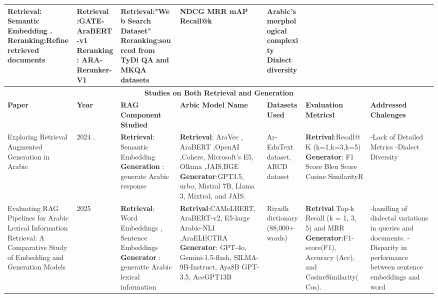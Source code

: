 \documentclass[runningheads]{llncs}
\begin{document}
\begin{table}
{\begin{tabular}{|p{3.5cm}|p{1.4cm}|p{3.5cm}|p{4.5cm}|p{3cm}|p{3.5cm}|p{3.5cm}|}
			\textbf{Retrieval}: Semantic Embedding . \newline 
			\textbf{Reranking}:Refine retrieved documents & Retrieval :GATE-AraBERT-v1 \newline
			Reranking : ARA-Reranker-V1\newline
			 &Retrieval:"Web Search Dataset" \newline Reranking:sourced from TyDi QA and MKQA datasets & NDCG \newline MRR \newline mAP \newline Recall@k &  Arabic’s morphological complexity \newline  Dialect diversity\\
			\hline
	        \multicolumn{7}{|c|}{\textbf{Studies on Both Retrieval and Generation}} \\
	        \hline
	       
	        \textbf{Paper} & \textbf{Year} & \textbf{RAG Component Studied} & \textbf{Arbic  Model Name} & \textbf{Datasets Used} & \textbf{Evaluation Metricsl} & \textbf{Addressed Chalenges} \\
	        \hline
			Exploring Retrieval Augmented Generation in Arabic \cite{ref_elbeltagy2024} & 2024 . &  \textbf{Retrieval}: Semantic Embedding \newline \textbf{Generation} : generate Arabic response  & \textbf{Retrieval}: AraVec , AraBERT ,OpenAI ,Cohere, Microsoft’s E5,  Ollama ,JAIS,BGE \newline \textbf{Generator}:GPT3.5, urbo, Mistral 
			7B, Llama 3, Mixtral, and JAIS.
			  & Ar-EduText dataset, \newline ARCD dataset 
			  &\textbf{Retrival}:Recall@K (k=1,k=3,k=5) \newline \textbf{Generator}: F1 Score Bleu Score Cosine SimilarityR&-Lack of Detailed Metrics \newline -Dialect Diversity \\
			\hline
		Evaluating RAG Pipelines for Arabic Lexical Information Retrieval: A Comparative Study of Embedding and Generation Models\cite{ref_alrasheed2025} & 2025 & \textbf{Retrieval}: Word Embeddings , Sentence Embeddings \newline \textbf{Generator} : generatte Arabic lexical information&\textbf{Retrival}:CAMeLBERT, AraBERT-v2, E5-large Arabic-NLI ,AraELECTRA  \newline \textbf{Generator}: GPT-4o, Gemini-1.5-flash, SILMA-9B-Instruct, Aya8B GPT-3.5, AceGPT13B&Riyadh dictionary (88,000+ words)&\textbf{Retrival} Top-k Recall (k = 1, 3, 5) and MRR \newline \textbf{Generator}:F1-score(F1),
		Accuracy (Acc), and CosineSimilarity(Cos). &-handling of dialectal variations in queries and documents. \newline -Disparity in performance between sentence embeddings and word \\
			\hline
	
		\end{tabular}
	} %
\end{table}
\end{document}
